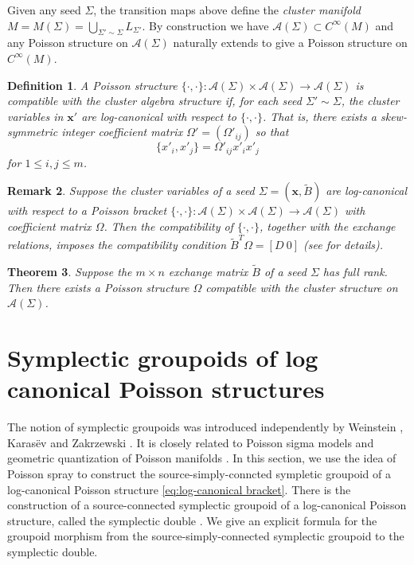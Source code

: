 \documentclass{amsart}
\newtheorem{theorem}{Theorem}[section]
\newtheorem{definition}[theorem]{Definition}
\newtheorem{remark}[theorem]{Remark}
\newcommand{\bfx}{\mathbf{x}}
\newcommand{\cA}{\mathcal{A}}
\begin{document}
Given any seed $\Sigma$, the transition maps above define the \emph{cluster manifold} $M=M(\Sigma)=\bigcup\limits_{\Sigma'\sim\Sigma}L_{\Sigma'}$.
By construction we have $\cA(\Sigma)\subset C^\infty(M)$ and any Poisson structure on $\cA(\Sigma)$ naturally extends to give a Poisson structure on $C^\infty(M)$.

\begin{definition}
  A Poisson structure $\{\cdot,\cdot\}:\cA(\Sigma)\times\cA(\Sigma)\to\cA(\Sigma)$ is \emph{compatible} with the cluster algebra structure if, for each seed $\Sigma'\sim\Sigma$, the cluster variables in $\bfx'$ are \emph{log-canonical} with respect to $\{\cdot,\cdot\}$.
  That is, there exists a skew-symmetric integer \emph{coefficient matrix} $\Omega'=(\Omega'_{ij})$ so that 
  \begin{equation}
    \label{eq:log-canonical bracket}
    \{x'_i,x'_j\}=\Omega'_{ij}x'_ix'_j
  \end{equation}
  for $1\le i,j\le m$.
\end{definition}
\begin{remark}
  Suppose the cluster variables of a seed $\Sigma=(\bfx,\tilde B)$ are log-canonical with respect to a Poisson bracket $\{\cdot,\cdot\}:\cA(\Sigma)\times\cA(\Sigma)\to\cA(\Sigma)$ with coefficient matrix $\Omega$.
  Then the compatibility of $\{\cdot,\cdot\}$, together with the exchange relations, imposes the compatibility condition $\tilde B^T\Omega=[D\ 0]$ (see \cite{berenstein-zelevinsky,gekhtman-shapiro-vainshtein} for details).
\end{remark}

\begin{theorem}
  \cite{gekhtman-shapiro-vainshtein}
  Suppose the $m\times n$ exchange matrix $\tilde B$ of a seed $\Sigma$ has full rank.  Then there exists a Poisson structure $\Omega$ compatible with the cluster structure on $\cA(\Sigma)$.
\end{theorem}


\section{Symplectic groupoids of log canonical Poisson structures}

The notion of symplectic groupoids was introduced independently by Weinstein \cite{MR866024}, Karas\"{e}v \cite{MR1008479} and Zakrzewski \cite{MR1081010, MR1081011}. It is closely related to Poisson sigma models \cite{MR1938552} and geometric quantization of Poisson manifolds \cite{MR2417440, MR2925830}. In this section, we use the idea of Poisson spray \cite{MR2900786} to construct the source-simply-conncted sympletic groupoid of a log-canonical Poisson structure \eqref{eq:log-canonical bracket}. There is the construction of a source-connected symplectic groupoid of a log-canonical Poisson structure, called the symplectic double \cite{MR2470108}. We give an explicit formula for the groupoid morphism from the source-simply-connected symplectic groupoid to the symplectic double.
\end{document}
